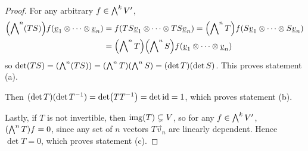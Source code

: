 \begin{proof}
    For any arbitrary \(f \in \operatorname{{\bigwedge}}^k V'\),
    \begin{align*}
        \pqty{\Asym^n (TS)} f(\vec{v}_1 \otimes \cdots \otimes \vec{v}_n)
        &= f(TS\vec{v}_1 \otimes \cdots \otimes TS\vec{v}_n)
        = \pqty{\Asym^n T} f(S\vec{v}_1 \otimes \cdots \otimes S\vec{v}_n) \\
        &= \pqty{\Asym^n T}\pqty{\Asym^n S} f(\vec{v}_1 \otimes \cdots \otimes \vec{v}_n)
    \end{align*}
    so \(\det(TS) = \pqty{\Asym^n (TS)} = \pqty{\Asym^n T}\pqty{\Asym^n S} = (\det T)(\det S)\).
    This proves statement (a).

    Then \((\det T)(\det T^{-1}) = \det(TT^{-1}) = \det\operatorname{id} = 1\),
    which proves statement (b).

    Lastly, if \(T\) is not invertible, then \(\operatorname{img}(T) \subsetneq V\),
    so for any \(f \in \operatorname{{\bigwedge}}^k V'\), \(\pqty{\Asym^n T} f = 0\),
    since any set of \(n\) vectors \(T\vec{v}_n\) are linearly dependent.
    Hence \(\det T = 0\), which proves statement (c).
\end{proof}

